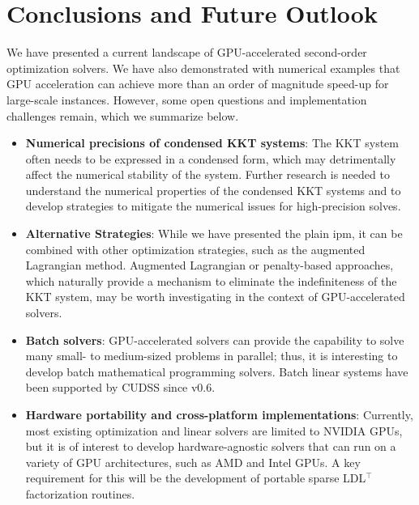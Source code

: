 \documentclass{article}
\begin{document}


\section{Conclusions and Future Outlook}\label{eqn:conclusion}
We have presented a current landscape of GPU-accelerated second-order optimization solvers. We have also demonstrated with numerical examples that GPU acceleration can achieve more than an order of magnitude speed-up for large-scale instances. However, some open questions and implementation challenges remain, which we summarize below.

\begin{itemize}[leftmargin=*,itemsep=0pt,parsep=0pt,partopsep=0pt]
\item \textbf{Numerical precisions of condensed KKT systems}: The KKT system often needs to be expressed in a condensed form, which may detrimentally affect the numerical stability of the system. Further research is needed to understand the numerical properties of the condensed KKT systems and to develop strategies to mitigate the numerical issues for high-precision solves.
\item \textbf{Alternative Strategies}: While we have presented the plain \gls*{ipm}, it can be combined with other optimization strategies, such as the augmented Lagrangian method. Augmented Lagrangian or penalty-based approaches, which naturally provide a mechanism to eliminate the indefiniteness of the KKT system, may be worth investigating in the context of GPU-accelerated solvers.
\item \textbf{Batch solvers}: GPU-accelerated solvers can provide the capability to solve many small- to medium-sized problems in parallel; thus, it is interesting to develop batch mathematical programming solvers. Batch linear systems have been supported by CUDSS since v0.6.
\item \textbf{Hardware portability and cross-platform implementations}: Currently, most existing optimization and linear solvers are limited to NVIDIA GPUs, but it is of interest to develop hardware-agnostic solvers that can run on a variety of GPU architectures, such as AMD and Intel GPUs. A key requirement for this will be the development of portable sparse LDL$^\top$ factorization routines.
\end{itemize}
\end{document}
